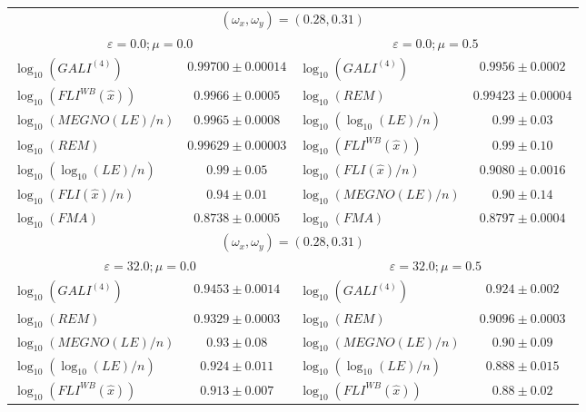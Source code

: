 \begin{table}[htb]
    \centering
    \begin{adjustbox}{width=\textwidth,center}
    \begin{tabular}{lc|lc}
        \hline
        \multicolumn{4}{c}{$(\omega_x, \omega_y) = (0.28, 0.31)$} \\
         \multicolumn{2}{c|}{$\varepsilon = 0.0; \mu = 0.0$} & \multicolumn{2}{c}{$\varepsilon = 0.0; \mu = 0.5$} \\
        \hline
        $\log_{{10}}(GALI^{{(4)}})$ & $0.99700 \pm 0.00014$ & $\log_{{10}}(GALI^{{(4)}})$ & $0.9956 \pm 0.0002$ \\ 
        $\log_{{10}}(FLI^{{WB}}(\hat{{x}}))$ & $0.9966 \pm 0.0005$ & $\log_{{10}}(REM)$ & $0.99423 \pm 0.00004$ \\ 
        $\log_{{10}}(MEGNO(LE)/n)$ & $0.9965 \pm 0.0008$ & $\log_{{10}}(\log_{{10}}(LE)/n)$ & $0.99 \pm 0.03$ \\ 
        $\log_{{10}}(REM)$ & $0.99629 \pm 0.00003$ & $\log_{{10}}(FLI^{{WB}}(\hat{{x}}))$ & $0.99 \pm 0.10$ \\ 
        $\log_{{10}}(\log_{{10}}(LE)/n)$ & $0.99 \pm 0.05$ & $\log_{{10}}(FLI(\hat{{x}})/n)$ & $0.9080 \pm 0.0016$ \\ 
        $\log_{{10}}(FLI(\hat{{x}})/n)$ & $0.94 \pm 0.01$ & $\log_{{10}}(MEGNO(LE)/n)$ & $0.90 \pm 0.14$ \\ 
        $\log_{{10}}(FMA)$ & $0.8738 \pm 0.0005$ & $\log_{{10}}(FMA)$ & $0.8797 \pm 0.0004$ \\ 
        \hline
        \multicolumn{4}{c}{$(\omega_x, \omega_y) = (0.28, 0.31)$} \\
         \multicolumn{2}{c|}{$\varepsilon = 32.0; \mu = 0.0$} & \multicolumn{2}{c}{$\varepsilon = 32.0; \mu = 0.5$} \\
        \hline
        $\log_{{10}}(GALI^{{(4)}})$ & $0.9453 \pm 0.0014$ & $\log_{{10}}(GALI^{{(4)}})$ & $0.924 \pm 0.002$ \\ 
        $\log_{{10}}(REM)$ & $0.9329 \pm 0.0003$ & $\log_{{10}}(REM)$ & $0.9096 \pm 0.0003$ \\ 
        $\log_{{10}}(MEGNO(LE)/n)$ & $0.93 \pm 0.08$ & $\log_{{10}}(MEGNO(LE)/n)$ & $0.90 \pm 0.09$ \\ 
        $\log_{{10}}(\log_{{10}}(LE)/n)$ & $0.924 \pm 0.011$ & $\log_{{10}}(\log_{{10}}(LE)/n)$ & $0.888 \pm 0.015$ \\ 
        $\log_{{10}}(FLI^{{WB}}(\hat{{x}}))$ & $0.913 \pm 0.007$ & $\log_{{10}}(FLI^{{WB}}(\hat{{x}}))$ & $0.88 \pm 0.02$ \\ 

\end{tabular}
\end{adjustbox}
\end{table}
